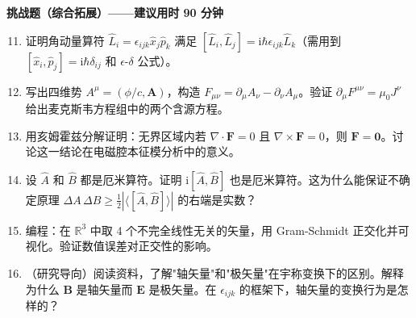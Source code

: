 \textbf{挑战题（综合拓展）——建议用时 90 分钟}

\begin{enumerate}
  \setcounter{enumi}{10}
  \item 证明角动量算符 $\hat{L}_i = \epsilon_{ijk}\hat{x}_j\hat{p}_k$ 满足 $[\hat{L}_i,\hat{L}_j] = \mathrm{i}\hbar\epsilon_{ijk}\hat{L}_k$（需用到 $[\hat{x}_i,\hat{p}_j]=\mathrm{i}\hbar\delta_{ij}$ 和 $\epsilon$-$\delta$ 公式）。
  \item 写出四维势 $A^\mu = (\phi/c,\mathbf{A})$，构造 $F_{\mu\nu} = \partial_\mu A_\nu - \partial_\nu A_\mu$。验证 $\partial_\mu F^{\mu\nu} = \mu_0 J^\nu$ 给出麦克斯韦方程组中的两个含源方程。
  \item 用亥姆霍兹分解证明：无界区域内若 $\nabla\cdot\mathbf{F}=0$ 且 $\nabla\times\mathbf{F}=0$，则 $\mathbf{F}=\mathbf{0}$。讨论这一结论在电磁腔本征模分析中的意义。
  \item 设 $\hat{A}$ 和 $\hat{B}$ 都是厄米算符。证明 $\mathrm{i}[\hat{A},\hat{B}]$ 也是厄米算符。这为什么能保证不确定原理 $\Delta A\,\Delta B \geq \frac12|\langle[\hat{A},\hat{B}]\rangle|$ 的右端是实数？
  \item 编程：在 $\mathbb{R}^3$ 中取 4 个不完全线性无关的矢量，用 Gram-Schmidt 正交化并可视化。验证数值误差对正交性的影响。
  \item （研究导向）阅读资料，了解"轴矢量"和"极矢量"在宇称变换下的区别。解释为什么 $\mathbf{B}$ 是轴矢量而 $\mathbf{E}$ 是极矢量。在 $\epsilon_{ijk}$ 的框架下，轴矢量的变换行为是怎样的？
\end{enumerate}
